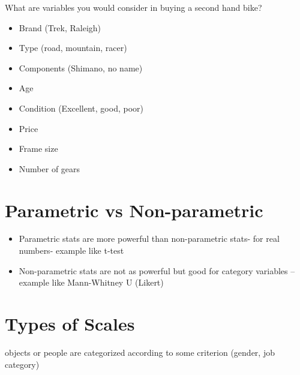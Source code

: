 \documentclass[
  letterpaper,
  DIV=11,
  numbers=noendperiod]{scrreprt}
\providecommand{\tightlist}{%
  \setlength{\itemsep}{0pt}\setlength{\parskip}{0pt}}\usepackage{longtable,booktabs,array}
\begin{document}
What are variables you would consider in buying a second hand bike?\\

\begin{itemize}
\tightlist
\item
  Brand (Trek, Raleigh)\\
\item
  Type (road, mountain, racer)\\
\item
  Components (Shimano, no name)\\
\item
  Age\\
\item
  Condition (Excellent, good, poor)\\
\item
  Price\\
\item
  Frame size\\
\item
  Number of gears\\
\end{itemize}

\section{Parametric vs
Non-parametric}\label{parametric-vs-non-parametric}

\begin{itemize}
\tightlist
\item
  Parametric stats are more powerful than non-parametric stats- for real
  numbers- example like t-test\\
\item
  Non-parametric stats are not as powerful but good for category
  variables -- example like Mann-Whitney U (Likert)\\
\end{itemize}

\section{Types of Scales}\label{types-of-scales}

\begin{tcolorbox}[enhanced jigsaw, rightrule=.15mm, arc=.35mm, colframe=quarto-callout-tip-color-frame, coltitle=black, left=2mm, colbacktitle=quarto-callout-tip-color!10!white, bottomtitle=1mm, titlerule=0mm, colback=white, breakable, opacitybacktitle=0.6, opacityback=0, toprule=.15mm, toptitle=1mm, title=\textcolor{quarto-callout-tip-color}{\faLightbulb}\hspace{0.5em}{Nominal}, bottomrule=.15mm, leftrule=.75mm]

objects or people are categorized according to some criterion (gender,
job category)

\end{tcolorbox}
\end{document}
